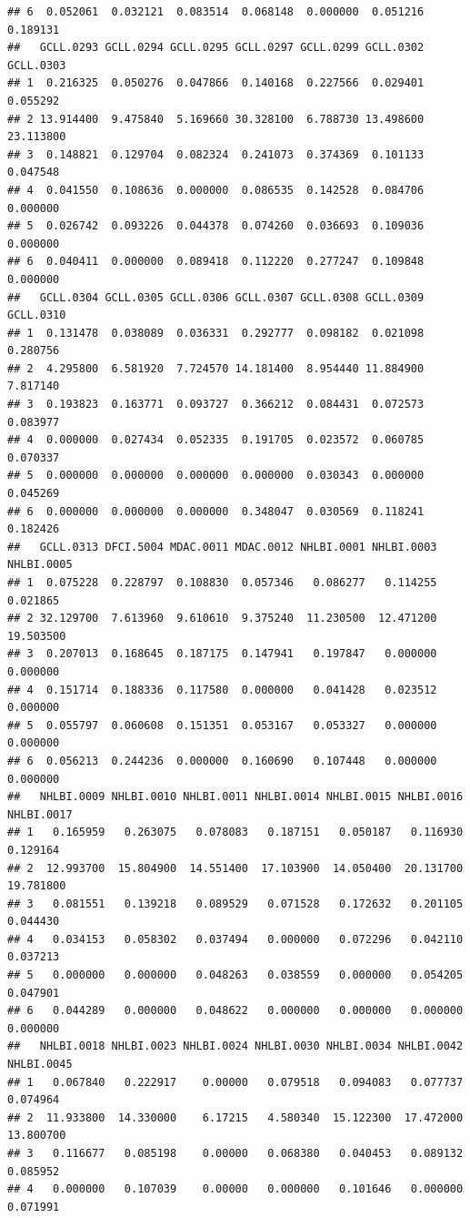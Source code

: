 \documentclass[
]{article}
\begin{document}
\begin{verbatim}
## 6  0.052061  0.032121  0.083514  0.068148  0.000000  0.051216  0.189131
##   GCLL.0293 GCLL.0294 GCLL.0295 GCLL.0297 GCLL.0299 GCLL.0302 GCLL.0303
## 1  0.216325  0.050276  0.047866  0.140168  0.227566  0.029401  0.055292
## 2 13.914400  9.475840  5.169660 30.328100  6.788730 13.498600 23.113800
## 3  0.148821  0.129704  0.082324  0.241073  0.374369  0.101133  0.047548
## 4  0.041550  0.108636  0.000000  0.086535  0.142528  0.084706  0.000000
## 5  0.026742  0.093226  0.044378  0.074260  0.036693  0.109036  0.000000
## 6  0.040411  0.000000  0.089418  0.112220  0.277247  0.109848  0.000000
##   GCLL.0304 GCLL.0305 GCLL.0306 GCLL.0307 GCLL.0308 GCLL.0309 GCLL.0310
## 1  0.131478  0.038089  0.036331  0.292777  0.098182  0.021098  0.280756
## 2  4.295800  6.581920  7.724570 14.181400  8.954440 11.884900  7.817140
## 3  0.193823  0.163771  0.093727  0.366212  0.084431  0.072573  0.083977
## 4  0.000000  0.027434  0.052335  0.191705  0.023572  0.060785  0.070337
## 5  0.000000  0.000000  0.000000  0.000000  0.030343  0.000000  0.045269
## 6  0.000000  0.000000  0.000000  0.348047  0.030569  0.118241  0.182426
##   GCLL.0313 DFCI.5004 MDAC.0011 MDAC.0012 NHLBI.0001 NHLBI.0003 NHLBI.0005
## 1  0.075228  0.228797  0.108830  0.057346   0.086277   0.114255   0.021865
## 2 32.129700  7.613960  9.610610  9.375240  11.230500  12.471200  19.503500
## 3  0.207013  0.168645  0.187175  0.147941   0.197847   0.000000   0.000000
## 4  0.151714  0.188336  0.117580  0.000000   0.041428   0.023512   0.000000
## 5  0.055797  0.060608  0.151351  0.053167   0.053327   0.000000   0.000000
## 6  0.056213  0.244236  0.000000  0.160690   0.107448   0.000000   0.000000
##   NHLBI.0009 NHLBI.0010 NHLBI.0011 NHLBI.0014 NHLBI.0015 NHLBI.0016 NHLBI.0017
## 1   0.165959   0.263075   0.078083   0.187151   0.050187   0.116930   0.129164
## 2  12.993700  15.804900  14.551400  17.103900  14.050400  20.131700  19.781800
## 3   0.081551   0.139218   0.089529   0.071528   0.172632   0.201105   0.044430
## 4   0.034153   0.058302   0.037494   0.000000   0.072296   0.042110   0.037213
## 5   0.000000   0.000000   0.048263   0.038559   0.000000   0.054205   0.047901
## 6   0.044289   0.000000   0.048622   0.000000   0.000000   0.000000   0.000000
##   NHLBI.0018 NHLBI.0023 NHLBI.0024 NHLBI.0030 NHLBI.0034 NHLBI.0042 NHLBI.0045
## 1   0.067840   0.222917    0.00000   0.079518   0.094083   0.077737   0.074964
## 2  11.933800  14.330000    6.17215   4.580340  15.122300  17.472000  13.800700
## 3   0.116677   0.085198    0.00000   0.068380   0.040453   0.089132   0.085952
## 4   0.000000   0.107039    0.00000   0.000000   0.101646   0.000000   0.071991

\end{verbatim}
\end{document}
